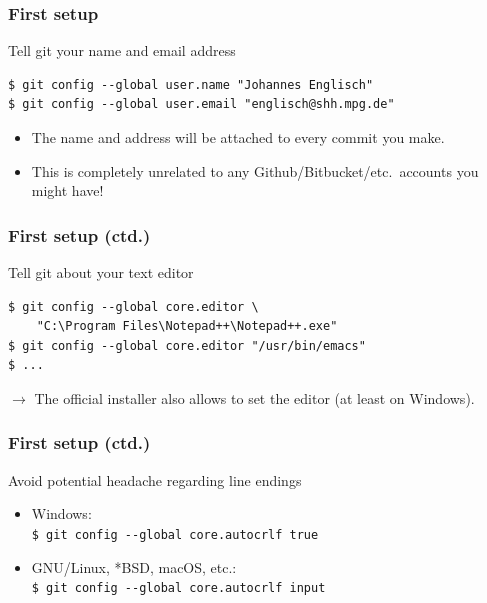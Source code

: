 \documentclass[12pt]{beamer}
\begin{document}
\begin{frame}[fragile]
  \frametitle{First setup}

  \begin{block}{Tell git your name and email address}
    {\footnotesize{}%
      \begin{verbatim}
$ git config --global user.name "Johannes Englisch"
$ git config --global user.email "englisch@shh.mpg.de"
      \end{verbatim}%
    }
    \begin{itemize}
      \item The name and address will be attached to \alert{every commit} you
        make.
      \item This is completely unrelated to any
        Github/\hspace{0}Bitbucket/\hspace{0}etc.\ accounts you might have!
    \end{itemize}
  \end{block}
\end{frame}

\begin{frame}[fragile]
  \frametitle{First setup (ctd.)}

  \begin{block}{Tell git about your text editor}
    {\footnotesize{}%
      \begin{verbatim}
$ git config --global core.editor \
    "C:\Program Files\Notepad++\Notepad++.exe"
$ git config --global core.editor "/usr/bin/emacs"
$ ...
      \end{verbatim}%
    }
    $\to$ The official installer also allows to set the editor
    (at least on Windows).
  \end{block}
\end{frame}

\begin{frame}[fragile]
  \frametitle{First setup (ctd.)}

  \begin{block}{Avoid potential headache regarding line endings}
    \begin{itemize}
      \item Windows: \\{}
        {\footnotesize{}\verb"$ git config --global core.autocrlf true"}
      \item GNU/Linux, *BSD, macOS, etc.:\\{}
        {\footnotesize{}\verb"$ git config --global core.autocrlf input"}
    \end{itemize}
  \end{block}
\end{frame}
\end{document}
